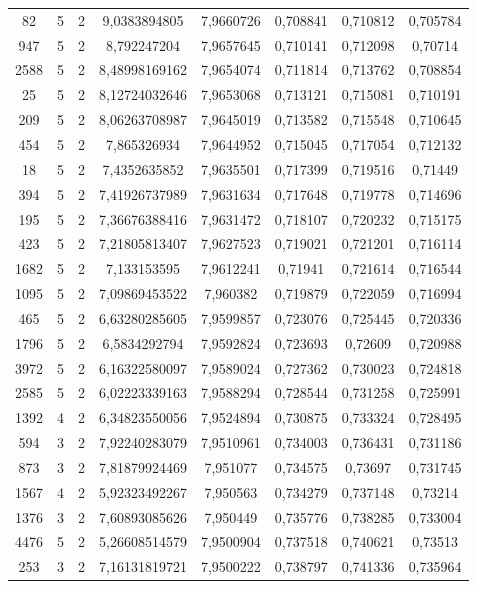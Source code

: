 \begin{longtable}{|c|c|c|c|c|c|c|c|}
82 & 5 & 2 & 9,0383894805 & 7,9660726 & 0,708841 & 0,710812 & 0,705784 \\
947 & 5 & 2 & 8,792247204 & 7,9657645 & 0,710141 & 0,712098 & 0,70714 \\
2588 & 5 & 2 & 8,48998169162 & 7,9654074 & 0,711814 & 0,713762 & 0,708854 \\
25 & 5 & 2 & 8,12724032646 & 7,9653068 & 0,713121 & 0,715081 & 0,710191 \\
209 & 5 & 2 & 8,06263708987 & 7,9645019 & 0,713582 & 0,715548 & 0,710645 \\
454 & 5 & 2 & 7,865326934 & 7,9644952 & 0,715045 & 0,717054 & 0,712132 \\
18 & 5 & 2 & 7,4352635852 & 7,9635501 & 0,717399 & 0,719516 & 0,71449 \\
394 & 5 & 2 & 7,41926737989 & 7,9631634 & 0,717648 & 0,719778 & 0,714696 \\
195 & 5 & 2 & 7,36676388416 & 7,9631472 & 0,718107 & 0,720232 & 0,715175 \\
423 & 5 & 2 & 7,21805813407 & 7,9627523 & 0,719021 & 0,721201 & 0,716114 \\
1682 & 5 & 2 & 7,133153595 & 7,9612241 & 0,71941 & 0,721614 & 0,716544 \\
1095 & 5 & 2 & 7,09869453522 & 7,960382 & 0,719879 & 0,722059 & 0,716994 \\
465 & 5 & 2 & 6,63280285605 & 7,9599857 & 0,723076 & 0,725445 & 0,720336 \\
1796 & 5 & 2 & 6,5834292794 & 7,9592824 & 0,723693 & 0,72609 & 0,720988 \\
3972 & 5 & 2 & 6,16322580097 & 7,9589024 & 0,727362 & 0,730023 & 0,724818 \\
2585 & 5 & 2 & 6,02223339163 & 7,9588294 & 0,728544 & 0,731258 & 0,725991 \\
1392 & 4 & 2 & 6,34823550056 & 7,9524894 & 0,730875 & 0,733324 & 0,728495 \\
594 & 3 & 2 & 7,92240283079 & 7,9510961 & 0,734003 & 0,736431 & 0,731186 \\
873 & 3 & 2 & 7,81879924469 & 7,951077 & 0,734575 & 0,73697 & 0,731745 \\
1567 & 4 & 2 & 5,92323492267 & 7,950563 & 0,734279 & 0,737148 & 0,73214 \\
1376 & 3 & 2 & 7,60893085626 & 7,950449 & 0,735776 & 0,738285 & 0,733004 \\
4476 & 5 & 2 & 5,26608514579 & 7,9500904 & 0,737518 & 0,740621 & 0,73513 \\
253 & 3 & 2 & 7,16131819721 & 7,9500222 & 0,738797 & 0,741336 & 0,735964 \\

\end{longtable}
